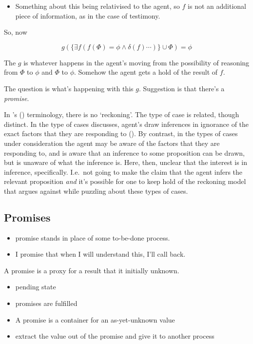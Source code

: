 \documentclass[10pt]{article}
\begin{document}
\begin{itemize}
\item Something about this being relativised to the agent, so \(f\) is not an additional piece of information, as in the case of testimony.
\end{itemize}

So, now

\[g(\{\exists f(f(\Phi) = \phi \land \delta(f) \cdots)\} \cup \Phi) = \phi\]

The \(g\) is whatever happens in the agent's moving from the possibility of reasoning from \(\Phi\) to \(\phi\) and \(\Phi\) to \(\phi\).
Somehow the agent gets a hold of the result of \(f\).

The question is what's happening with this \(g\).
Suggestion is that there's a \emph{promise}.




In \citeauthor{Siegel:2019aa}'s (\citeyear{Siegel:2019aa}) terminology, there is no `reckoning'.
The type of case is related, though distinct.
In the type of cases \citeauthor{Siegel:2019aa} discusses, agent's draw inferences in ignorance of the exact factors that they are responding to (\citeyear[8]{Siegel:2019aa}).
By contrast, in the types of cases under consideration the agent may be aware of the factors that they are responding to, and is aware that an inference to some proposition can be drawn, but is unaware of what the inference is.
Here, then, unclear that the interest is in inference, specifically.
I.e.\ not going to make the claim that the agent infers the relevant proposition \emph{and} it's possible for one to keep hold of the reckoning model that \citeauthor{Siegel:2019aa} argues against while puzzling about these types of cases.


\subsection{Promises}
\label{sec:promises}

\begin{itemize}
\item promise stands in place of some to-be-done process.
\item I promise that when I will understand this, I'll call back.
\end{itemize}

A promise is a proxy for a result that it initially unknown.

\begin{itemize}
\item pending state
\item promises are fulfilled
\item A promise is a container for an as-yet-unknown value
\item extract the value out of the promise and give it to another process
\end{itemize}
\end{document}
